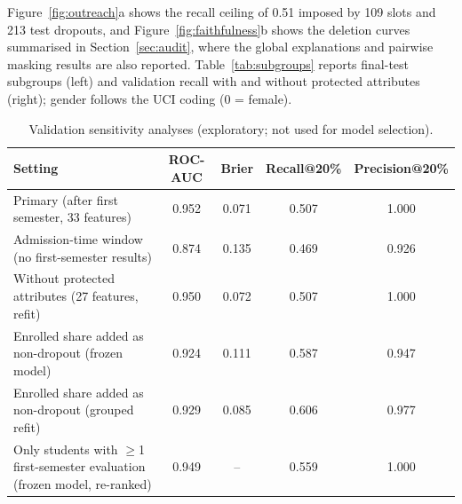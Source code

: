 Figure~\ref{fig:outreach}a shows the recall ceiling of 0.51 imposed by 109 slots and 213 test
dropouts, and Figure~\ref{fig:faithfulness}b shows the deletion curves summarised in
Section~\ref{sec:audit}, where the global explanations and pairwise masking results are also
reported. Table~\ref{tab:subgroups} reports final-test subgroups (left) and validation recall with
and without protected attributes (right); gender follows the UCI coding (0 = female).

\begin{table}[H]
\centering
\caption{Validation sensitivity analyses (exploratory; not used for model selection).}
\label{tab:sensitivity}
\footnotesize
\begin{tabular}{@{}lcccc@{}}
\toprule
\textbf{Setting} & \textbf{ROC-AUC} & \textbf{Brier} & \textbf{Recall@20\%} & \textbf{Precision@20\%} \\
\midrule
Primary (after first semester, 33 features) & 0.952 & 0.071 & 0.507 & 1.000 \\
Admission-time window (no first-semester results) & 0.874 & 0.135 & 0.469 & 0.926 \\
Without protected attributes (27 features, refit) & 0.950 & 0.072 & 0.507 & 1.000 \\
Enrolled share added as non-dropout (frozen model) & 0.924 & 0.111 & 0.587 & 0.947 \\
Enrolled share added as non-dropout (grouped refit) & 0.929 & 0.085 & 0.606 & 0.977 \\
Only students with $\geq$1 first-semester evaluation (frozen model, re-ranked) & 0.949 & -- & 0.559 & 1.000 \\
\bottomrule
\end{tabular}
\end{table}

